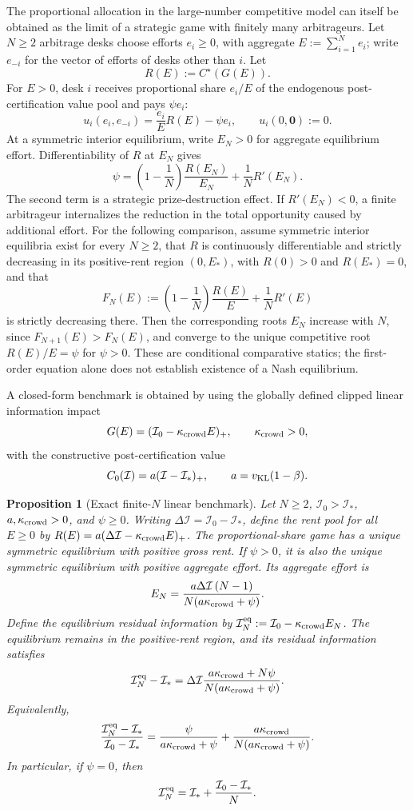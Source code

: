 \documentclass[11pt]{article}
\numberwithin{equation}{section}
\theoremstyle{plain}
\newtheorem{proposition}[theorem]{Proposition}
\theoremstyle{definition}
\theoremstyle{remark}
\begin{document}
The proportional allocation in the large-number competitive model can itself be
obtained as the limit of a strategic game with finitely many arbitrageurs. Let
$N\ge2$ arbitrage desks choose efforts $e_i\ge0$, with aggregate
$E:=\sum_{i=1}^N e_i$; write $e_{-i}$ for the vector of efforts of desks other than $i$. Let
\[
R(E):=C^\star(G(E)).
\]
For \(E>0\), desk \(i\) receives proportional share \(e_i/E\) of the
endogenous post-certification value pool and pays \(\psi e_i\):
\[
u_i(e_i,e_{-i})=\frac{e_i}{E}R(E)-\psi e_i,\qquad u_i(0,\mathbf0):=0.
\]
At a symmetric interior equilibrium, write $E_N>0$ for aggregate equilibrium effort. Differentiability of $R$ at $E_N$ gives
\[
\psi=
\left(1-\frac1N\right)\frac{R(E_N)}{E_N}
+\frac1N R'(E_N).
\]
The second term is a strategic prize-destruction effect. If $R'(E_N)<0$, a finite arbitrageur internalizes the reduction in the total opportunity caused by additional effort. For the following comparison, assume symmetric interior equilibria exist for every $N\ge2$, that $R$ is continuously differentiable and strictly decreasing in its positive-rent region $(0,E_*)$, with $R(0)>0$ and $R(E_*)=0$, and that
\[
F_N(E):=\left(1-\frac1N\right)\frac{R(E)}E+\frac1N R'(E)
\]
is strictly decreasing there. Then the corresponding roots $E_N$ increase with $N$, since $F_{N+1}(E)>F_N(E)$, and converge to the unique competitive root $R(E)/E=\psi$ for $\psi>0$. These are conditional comparative statics; the first-order equation alone does not establish existence of a Nash equilibrium.

A closed-form benchmark is obtained by using the globally defined clipped linear information impact
\[
G(E)=(\mathcal I_0-{\kappa_{{\rm crowd}}} E)_+,
\qquad {\kappa_{{\rm crowd}}}>0,
\]
with the constructive post-certification value
\[
C_0(\mathcal I)=a(\mathcal I-\mathcal I_*)_+,
\qquad a={v_{\rm KL}}(1-\beta).
\]

\begin{proposition}[Exact finite-$N$ linear benchmark]\label{prop:finite-linear}
Let $N\ge2$, $\mathcal I_0>\mathcal I_*$, $a,{\kappa_{{\rm crowd}}}>0$, and $\psi\ge0$. Writing
$\Delta\mathcal I=\mathcal I_0-\mathcal I_*$, define the rent pool for all $E\ge0$ by
$R(E)=a(\Delta\mathcal I-{\kappa_{{\rm crowd}}} E)_+$.
The proportional-share game has a unique symmetric equilibrium with positive gross rent. If $\psi>0$, it is also the unique symmetric equilibrium with positive aggregate effort. Its aggregate effort is
\[
E_N=\frac{a\Delta\mathcal I\,(N-1)}{N(a{\kappa_{{\rm crowd}}}+\psi)}.
\]
Define the equilibrium residual information by $\mathcal I_N^{\rm eq}:=\mathcal I_0-{\kappa_{{\rm crowd}}} E_N$.
The equilibrium remains in the positive-rent region, and its residual information satisfies
\[
\mathcal I_N^{\rm eq}-\mathcal I_*
=\Delta\mathcal I\frac{a{\kappa_{{\rm crowd}}}+N\psi}{N(a{\kappa_{{\rm crowd}}}+\psi)}.
\]
Equivalently,
\[
\frac{\mathcal I_N^{\rm eq}-\mathcal I_*}{\mathcal I_0-\mathcal I_*}
=
\frac{\psi}{a{\kappa_{{\rm crowd}}}+\psi}
+
\frac{a{\kappa_{{\rm crowd}}}}{N(a{\kappa_{{\rm crowd}}}+\psi)}.
\]
In particular, if $\psi=0$, then
\[
\mathcal I_N^{\rm eq}=\mathcal I_*+\frac{\mathcal I_0-\mathcal I_*}{N}.
\]
\end{proposition}
\end{document}
